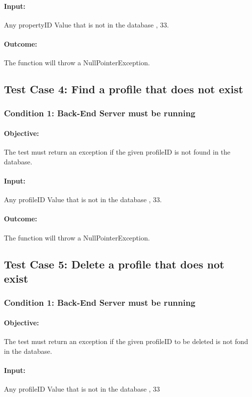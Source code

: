 \documentclass[a4paper,12pt]{article}
\begin{document}
\paragraph{Input:} Any propertyID Value that is not in the database , 33.
\paragraph{Outcome: } The function will throw a NullPointerException.

\subsection{Test Case 4: Find a profile that does not exist}
\subsubsection{Condition 1: Back-End Server must be running}
\paragraph{Objective:}The test must return an exception if the given profileID is not found in the database.
\paragraph{Input:} Any profileID Value that is not in the database , 33.
\paragraph{Outcome: } The function will throw a NullPointerException.

\subsection{Test Case 5: Delete a profile that does not exist}
\subsubsection{Condition 1: Back-End Server must be running}
\paragraph{Objective:}The test must return an exception if the given profileID to be deleted is not fond in the database.
\paragraph{Input:} Any profileID Value that is not in the database , 33
\end{document}
